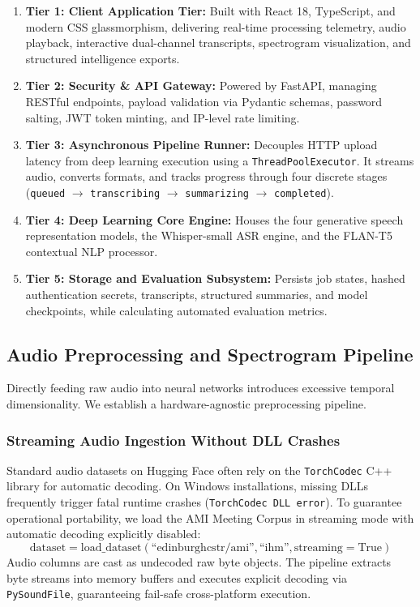 \documentclass[conference]{IEEEtran}
\begin{document}
\begin{enumerate}
    \item \textbf{Tier 1: Client Application Tier:} Built with React 18, TypeScript, and modern CSS glassmorphism, delivering real-time processing telemetry, audio playback, interactive dual-channel transcripts, spectrogram visualization, and structured intelligence exports.
    \item \textbf{Tier 2: Security \& API Gateway:} Powered by FastAPI, managing RESTful endpoints, payload validation via Pydantic schemas, password salting, JWT token minting, and IP-level rate limiting.
    \item \textbf{Tier 3: Asynchronous Pipeline Runner:} Decouples HTTP upload latency from deep learning execution using a \texttt{ThreadPoolExecutor}. It streams audio, converts formats, and tracks progress through four discrete stages (\texttt{queued} $\to$ \texttt{transcribing} $\to$ \texttt{summarizing} $\to$ \texttt{completed}).
    \item \textbf{Tier 4: Deep Learning Core Engine:} Houses the four generative speech representation models, the Whisper-small ASR engine, and the FLAN-T5 contextual NLP processor.
    \item \textbf{Tier 5: Storage and Evaluation Subsystem:} Persists job states, hashed authentication secrets, transcripts, structured summaries, and model checkpoints, while calculating automated evaluation metrics.
\end{enumerate}

\subsection{Audio Preprocessing and Spectrogram Pipeline}
Directly feeding raw audio into neural networks introduces excessive temporal dimensionality. We establish a hardware-agnostic preprocessing pipeline.

\subsubsection{Streaming Audio Ingestion Without DLL Crashes}
Standard audio datasets on Hugging Face often rely on the \texttt{TorchCodec} C++ library for automatic decoding. On Windows installations, missing DLLs frequently trigger fatal runtime crashes (\texttt{TorchCodec DLL error}). To guarantee operational portability, we load the AMI Meeting Corpus in streaming mode with automatic decoding explicitly disabled:
\begin{equation}
\text{dataset} = \text{load\_dataset}(\text{``edinburghcstr/ami''}, \text{``ihm''}, \text{streaming}=\text{True})
\end{equation}
Audio columns are cast as undecoded raw byte objects. The pipeline extracts byte streams into memory buffers and executes explicit decoding via \texttt{PySoundFile}, guaranteeing fail-safe cross-platform execution.
\end{document}
